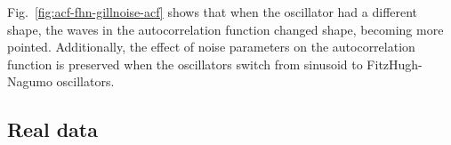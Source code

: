 Fig.\ \ref{fig:acf-fhn-gillnoise-acf} shows that when the oscillator had a different shape, the waves in the autocorrelation function changed shape, becoming more pointed.
Additionally, the effect of noise parameters on the autocorrelation function is preserved when the oscillators switch from sinusoid to FitzHugh-Nagumo oscillators.


\subsection{Real data}
\label{subsubsec:analysis-characterisation-real}

